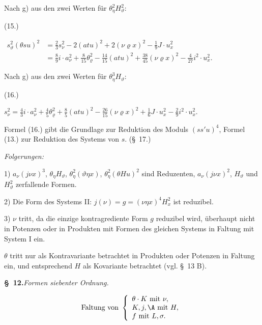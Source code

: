 Nach g) aus den zwei Werten für $\theta_\eta^2H_\vartheta^2$:
\par\smallskip\noindent
\begin{minipage}[c]{3.6em}
\centering (15.)
\end{minipage}%
\begin{minipage}[c]{\dimexpr\linewidth-3.6em\relax}
\centering
\(\displaystyle
\begin{aligned}
s_\vartheta^2(\theta su)^2
&=\frac23s_\nu^2-2(atu)^2+2(\nu\varrho x)^2-\frac19J\cdot u_x^2\\
&=\frac89i\cdot a_\nu^2+\frac8{15}\theta_\varrho^2-\frac{14}{15}(atu)^2+\frac{38}{45}(\nu\varrho x)^2-\frac4{27}i^2\cdot u_x^2.
\end{aligned}
\)
\end{minipage}
\par\smallskip
Nach g) aus den zwei Werten für $\theta_\eta^3H_\vartheta$:
\par\smallskip\noindent
\begin{minipage}[c]{3.6em}
\centering (16.)
\end{minipage}%
\begin{minipage}[c]{\dimexpr\linewidth-3.6em\relax}
\centering
\(\displaystyle
s_\nu^2=\frac43i\cdot a_\nu^2+\frac45\theta_\varrho^2+\frac85(atu)^2-\frac{26}{15}(\nu\varrho x)^2+\frac16J\cdot u_x^2-\frac29i^2\cdot u_x^2.
\)
\end{minipage}
\par\smallskip
Formel (16.) gibt die Grundlage zur Reduktion des Moduls $(ss'u)^4$, Formel (13.) zur Reduktion des Systems von $s$. (\S\ 17.)

\noindent\emph{Folgerungen:}

1) $a_\nu(j\nu x)^3$, $\theta_\eta H_\vartheta$, $\theta_\eta^2(\vartheta\eta x)$, $\theta_\eta^2(\theta Hu)^2$ sind Reduzenten, $a_\nu(j\nu x)^2$, $H_\vartheta$ und $H_\vartheta^2$ zerfallende Formen.

2) Die Form des Systems II: $j(\nu)=g=(\nu\eta x)^4H_x^2$ ist reduzibel.

3) $\nu$ tritt, da die einzige kontragrediente Form $g$ reduzibel wird, überhaupt nicht in Potenzen oder in Produkten mit Formen des gleichen Systems in Faltung mit System I ein.

$\theta$ tritt nur als Kontravariante betrachtet in Produkten oder Potenzen in Faltung ein, und entsprechend $H$ als Kovariante betrachtet (vgl. \S\ 13 B).

\begin{center}
\textbf{\S\ 12.}\quad\emph{Formen siebenter Ordnung.}
\end{center}
\[
\text{Faltung von }\left\{\begin{array}{l}
\theta\cdot K\text{ mit }\nu,\\
K,j,\A\text{ mit }H,\\
f\text{ mit }L,\sigma.
\end{array}\right.
\]


